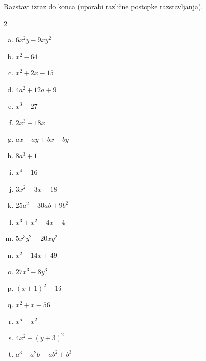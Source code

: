 \documentclass[a4paper,12pt]{letter}
\newcounter{tocke}
\begin{document}
\begin{naloga}[\hfill $\tockeK$] \addtocounter{tocke}{\numexpr\tockeK\relax}
Razstavi izraz do konca (uporabi razli\v{c}ne postopke razstavljanja).
\begin{multicols}{2}
\begin{enumerate}[a)]
\item $\displaystyle 6x^2y-9xy^2$
\item $\displaystyle x^2-64$
\item $\displaystyle x^2+2x-15$
\item $\displaystyle 4a^2+12a+9$
\item $\displaystyle x^3-27$
\item $\displaystyle 2x^3-18x$
\item $\displaystyle ax-ay+bx-by$
\item $\displaystyle 8a^3+1$
\item $\displaystyle x^4-16$
\item $\displaystyle 3x^2-3x-18$
\end{enumerate}
\columnbreak
\begin{enumerate}[a)]\setcounter{enumi}{10}
\item $\displaystyle 25a^2-30ab+9b^2$
\item $\displaystyle x^3+x^2-4x-4$
\item $\displaystyle 5x^3y^2-20xy^2$
\item $\displaystyle x^2-14x+49$
\item $\displaystyle 27x^3-8y^3$
\item $\displaystyle (x+1)^2-16$
\item $\displaystyle x^2+x-56$
\item $\displaystyle x^5-x^2$
\item $\displaystyle 4x^2-(y+3)^2$
\item $\displaystyle a^3-a^2b-ab^2+b^3$
\end{enumerate}
\end{multicols}
\end{naloga}
\end{document}
